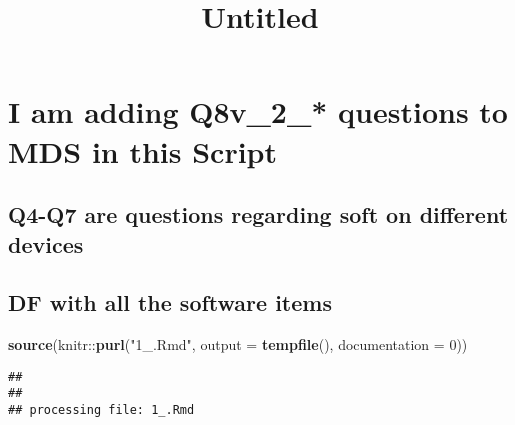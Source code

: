 \documentclass[]{article}
\title{Untitled}
\author{}
\date{}
\newenvironment{Shaded}{\begin{snugshade}}{\end{snugshade}}
\newcommand{\KeywordTok}[1]{\textcolor[rgb]{0.13,0.29,0.53}{\textbf{{#1}}}}
\newcommand{\DataTypeTok}[1]{\textcolor[rgb]{0.13,0.29,0.53}{{#1}}}
\newcommand{\DecValTok}[1]{\textcolor[rgb]{0.00,0.00,0.81}{{#1}}}
\newcommand{\StringTok}[1]{\textcolor[rgb]{0.31,0.60,0.02}{{#1}}}
\newcommand{\NormalTok}[1]{{#1}}
\begin{document}
\maketitle

\section{I am adding Q8v\_2\_* questions to MDS in this
Script}\label{i-am-adding-q8vux5f2ux5f-questions-to-mds-in-this-script}

\subsection{Q4-Q7 are questions regarding soft on different
devices}\label{q4-q7-are-questions-regarding-soft-on-different-devices}

\subsection{DF with all the software
items}\label{df-with-all-the-software-items}

\begin{Shaded}
\begin{Highlighting}[]
\KeywordTok{source}\NormalTok{(knitr::}\KeywordTok{purl}\NormalTok{(}\StringTok{"1_.Rmd"}\NormalTok{, }\DataTypeTok{output =} \KeywordTok{tempfile}\NormalTok{(), }\DataTypeTok{documentation =} \DecValTok{0}\NormalTok{))}
\end{Highlighting}
\end{Shaded}

\begin{verbatim}
## 
## 
## processing file: 1_.Rmd
\end{verbatim}
\end{document}
